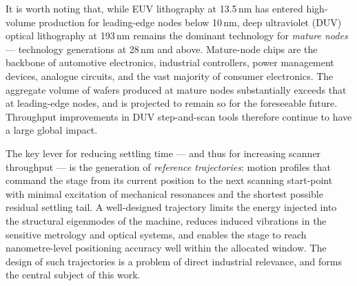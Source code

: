 It is worth noting that, while EUV lithography at 13.5\,nm has entered high-volume production for leading-edge nodes below 10\,nm, deep ultraviolet (DUV) optical lithography at 193\,nm remains the dominant technology for \textit{mature nodes} — technology generations at 28\,nm and above. Mature-node chips are the backbone of automotive electronics, industrial controllers, power management devices, analogue circuits, and the vast majority of consumer electronics. The aggregate volume of wafers produced at mature nodes substantially exceeds that at leading-edge nodes, and is projected to remain so for the foreseeable future. Throughput improvements in DUV step-and-scan tools therefore continue to have a large global impact.

The key lever for reducing settling time — and thus for increasing scanner throughput — is the generation of \textit{reference trajectories}: motion profiles that command the stage from its current position to the next scanning start-point with minimal excitation of mechanical resonances and the shortest possible residual settling tail. A well-designed trajectory limits the energy injected into the structural eigenmodes of the machine, reduces induced vibrations in the sensitive metrology and optical systems, and enables the stage to reach nanometre-level positioning accuracy well within the allocated window. The design of such trajectories is a problem of direct industrial relevance, and forms the central subject of this work.

\medskip

